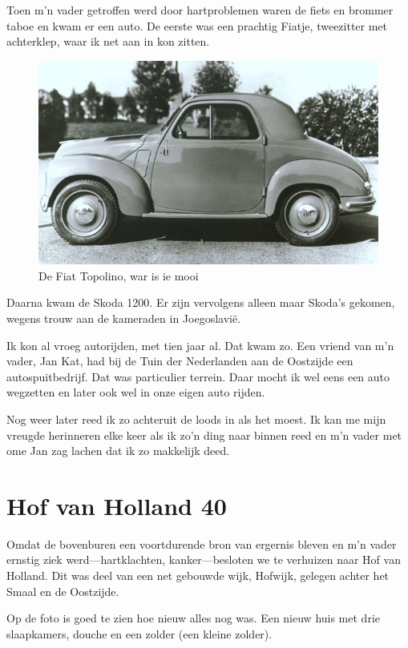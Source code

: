 \documentclass[10pt,twoside, openright]{memoir}
\begin{document}
Toen m'n vader getroffen werd door hartproblemen waren de fiets en brommer taboe en kwam er een auto. De eerste was een prachtig Fiatje, tweezitter met achterklep, waar ik net aan in kon zitten. 

\begin{figure}
\includegraphics[width=\textwidth]{img/111Fiat-Topolino.jpg}
\caption*{\footnotesize De Fiat Topolino, war is ie mooi}
\end{figure}

Daarna kwam de Skoda 1200. Er zijn vervolgens alleen maar Skoda's gekomen, wegens trouw aan de kameraden in Joegoslavië. 

Ik kon al vroeg autorijden, met tien jaar al. Dat kwam zo. Een vriend van m'n vader, Jan Kat, had bij de Tuin der Nederlanden aan de Oostzijde een autospuitbedrijf. Dat was particulier terrein. Daar mocht ik wel eens een auto wegzetten en later ook wel in onze eigen auto rijden. 

Nog weer later reed ik zo achteruit de loods in als het moest. Ik kan me mijn vreugde herinneren elke keer als ik zo'n ding naar binnen reed en m'n vader met ome Jan zag lachen dat ik zo makkelijk deed.

\section{Hof van Holland 40} %
\label{cha:hofvanholland}

Omdat de bovenburen een voortdurende bron van ergernis bleven en m’n vader ernstig ziek werd---hartklachten, kanker---besloten we te verhuizen naar Hof van Holland. Dit was deel van een net gebouwde wijk, Hofwijk, gelegen achter het Smaal en de Oostzijde. 

Op de foto is goed te zien hoe nieuw alles nog was. Een nieuw huis met drie slaapkamers, douche en een zolder (een kleine zolder). 
\end{document}
